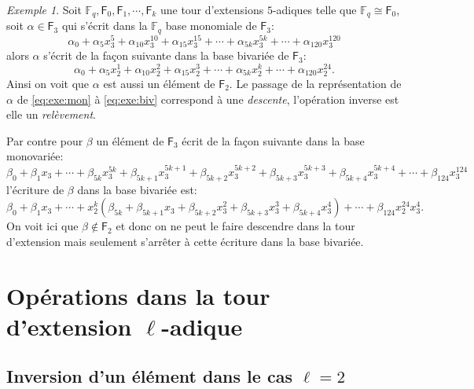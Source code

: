 \documentclass[10pt,a4paper]{book}
\theoremstyle{plain}
\theoremstyle{definition}
\theoremstyle{definition}
\theoremstyle{definition}
\theoremstyle{definition}
\theoremstyle{remark}
\theoremstyle{remark}
\newtheorem{exe}[thm]{Exemple}
\begin{document}
\begin{exe}
Soit $\mathbb{F}_q, \mathsf{F}_0, \mathsf{F}_1, \cdots, \mathsf{F}_k$ une tour d'extensions $5$-adiques telle que $\mathbb{F}_q \cong \mathsf{F}_0$, soit $\alpha \in \mathsf{F}_3$ qui s'écrit dans la $\mathbb{F}_q$ base monomiale de $\mathsf{F}_3$:
\begin{equation}
\label{eq:exe:mon}
\alpha_0 + \alpha_5x_3^5+ \alpha_{10}x_3^{10} + \alpha_{15}x_3^{15} + \cdots + \alpha_{5k}x_3^{5k} + \cdots + \alpha_{120}x_3^{120} 
\end{equation} 
alors $\alpha$ s'écrit de la façon suivante dans la base bivariée de $\mathsf{F}_3$:
\begin{equation}
\label{eq:exe:biv}
\alpha_0 + \alpha_5x_2^1+ \alpha_{10}x_2^{2} + \alpha_{15}x_2^{3} + \cdots + \alpha_{5k}x_2^{k} + \cdots + \alpha_{120}x_2^{24}. 
\end{equation} 
 Ainsi on voit que $\alpha$ est aussi un élément de $\mathsf{F}_2$. Le passage de la représentation de $\alpha$ de \eqref{eq:exe:mon} à \eqref{eq:exe:biv} correspond à une \emph{descente}, l'opération inverse est elle un \emph{relèvement}.
 
 Par contre pour $\beta$ un élément de $\mathsf{F}_3$ écrit de la façon suivante dans la base monovariée:
 \begin{equation}
 \beta_0 + \beta_1 x_3+ \cdots +\beta_{5k}x_3^{5k} + \beta_{5k+1}x_3^{5k+1}+\beta_{5k+2}x_3^{5k+2}+ \beta_{5k+3}x_3^{5k+3}+ \beta_{5k+4}x_3^{5k+4}+ \cdots + \beta_{124}x_3^{124}
 \end{equation}
l'écriture de $\beta$ dans la base bivariée est: 
 \begin{equation}
  \beta_0 + \beta_1 x_3+ \cdots + x_2^{k}(\beta_{5k}+\beta_{5k+1} x_3 + \beta_{5k+2} x_3^2 + \beta_{5k+3} x_3^3 + \beta_{5k+4}x_3^4)+ \cdots + \beta_{124}x_2^{24}x_3^{4}.
 \end{equation}
 On voit ici que $\beta \notin \mathsf{F}_2$ et donc on ne peut le faire descendre dans la tour d'extension mais seulement s'arrêter à cette écriture dans la base bivariée.
\end{exe}

\section{Opérations dans la tour d'extension $\ell$-adique}

\subsection*{Inversion d'un élément dans le cas $\ell=2$}
\end{document}
